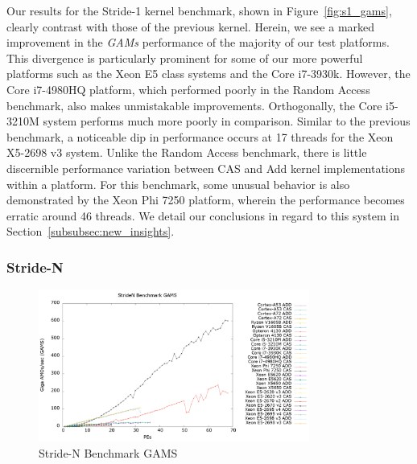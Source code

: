 Our results for the Stride-1 kernel benchmark, shown in Figure~\ref{fig:s1_gams}, clearly contrast with those of the previous kernel.
Herein, we see a marked improvement in the \textit{GAMs} performance of the majority of our test platforms.
This divergence is particularly prominent for some of our more powerful platforms such as the Xeon E5 class systems and the Core i7-3930k.
However, the Core i7-4980HQ platform, which performed poorly in the Random Access benchmark, also makes unmistakable improvements.
Orthogonally, the Core i5-3210M system performs much more poorly in comparison.
Similar to the previous benchmark, a noticeable dip in performance occurs at 17 threads for the Xeon X5-2698 v3 system.
Unlike the Random Access benchmark, there is little discernible performance variation between CAS and Add kernel implementations within a platform.
For this benchmark, some unusual behavior is also demonstrated by the Xeon Phi 7250 platform, wherein the performance becomes erratic around 46 threads.
We detail our conclusions in regard to this system in Section~\ref{subsubsec:new_insights}.

\subsubsection{Stride-N}
\label{subsubsec:striden_res}

\begin{figure}[!t]
\centering
\includegraphics[width=3.5in]{figures/STRIDEN_GAMS.png}
\caption{Stride-N Benchmark GAMS}
\label{fig:sn_gams}
\end{figure}

